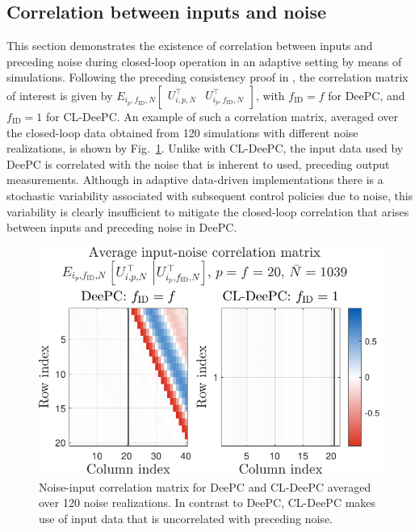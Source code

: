 \subsection{Correlation between inputs and noise}
\noindent This section demonstrates the existence of correlation between inputs and preceding noise during closed-loop operation in an adaptive setting by means of simulations. Following the preceding consistency proof in , the correlation matrix of interest is given by $E_{i_p,f_\mathrm{ID},N}\begin{bmatrix}U_{i,p,N}^\top & U_{i_p,f_\mathrm{ID},N}^\top\end{bmatrix}$, with $f_\mathrm{ID}=f$ for \ac{DeePC}, and $f_\mathrm{ID}=1$ for \ac{CL-DeePC}. An example of such a correlation matrix, averaged over the closed-loop data obtained from 120 simulations with different noise realizations, is shown by Fig.~\ref{fig:EfUpf_correlation}. Unlike with \ac{CL-DeePC}, the input data used by \ac{DeePC} is correlated with the noise that is inherent to used, preceding output measurements. Although in adaptive data-driven implementations there is a stochastic variability associated with subsequent control policies due to noise, this variability is clearly insufficient to mitigate the closed-loop correlation that arises between inputs and preceding noise in \ac{DeePC}.
\begin{figure}[b!]
\begin{center}
\includegraphics[width=\columnwidth]{results/figures/Correlation_Nbar_1039_p_20_f_20_Re_1_Ru_1_Rdu_0_Q_100_R_0_dR_10.pdf}    %
\caption{Noise-input correlation matrix for \ac{DeePC} and \ac{CL-DeePC} averaged over 120 noise realizations. In contrast to \ac{DeePC}, \ac{CL-DeePC} makes use of input data that is uncorrelated with preceding noise.}  %
\label{fig:EfUpf_correlation}                                 %
\end{center}                                 %
\end{figure}

